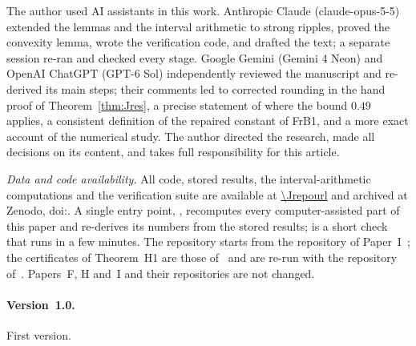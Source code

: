 \begin{acknowledgments}
The author used AI assistants in this work. Anthropic Claude (claude-opus-5-5) extended the lemmas and the interval arithmetic to strong ripples, proved the convexity lemma, wrote the verification code, and drafted the text; a separate session re-ran and checked every stage. Google Gemini (Gemini 4 Neon) and OpenAI ChatGPT (GPT-6 Sol) independently reviewed the manuscript and re-derived its main steps; their comments led to corrected rounding in the hand proof of Theorem~\ref{thm:Jres}, a precise statement of where the bound $0.49$ applies, a consistent definition of the repaired constant of FrB1, and a more exact account of the numerical study. The author directed the research, made all decisions on its content, and takes full responsibility for this article.
\end{acknowledgments}

\emph{Data and code availability.}
All code, stored results, the interval-arithmetic computations and the verification suite are available at \url{\Jrepourl} and archived at Zenodo, doi:\Jcodedoi.
A single entry point, , recomputes every computer-assisted part of this paper and re-derives its numbers from the stored results;  is a short check that runs in a few minutes.
The repository starts from the repository of Paper~I~\cite{Icode}; the certificates of Theorem~H1 are those of~\cite{H} and are re-run with the repository of~\cite{H}.
Papers~F, H and~I and their repositories are not changed.

\paragraph*{Version~1.0.}
First version.

